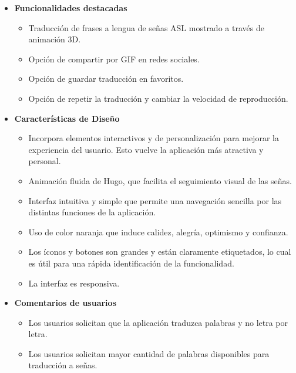     
\begin{itemize}
    \item \textbf{Funcionalidades destacadas}
    \begin{itemize}
        \item Traducción de frases a lengua de señas ASL mostrado a través de animación 3D.
        \item Opción de compartir por GIF en redes sociales.
        \item Opción de guardar traducción en favoritos.
        \item Opción de repetir la traducción y cambiar la velocidad de reproducción.
    \end{itemize}
    
    \item \textbf{Características de Diseño}
    \begin{itemize}
        \item Incorpora elementos interactivos y de personalización para mejorar la experiencia del usuario. Esto vuelve la aplicación más atractiva y personal.
        \item Animación fluida de Hugo, que facilita el seguimiento visual de las señas.
        \item Interfaz intuitiva y simple que permite una navegación sencilla por las distintas funciones de la aplicación.
        \item Uso de color naranja que induce calidez, alegría, optimismo y confianza.
        \item Los íconos y botones son grandes y están claramente etiquetados, lo cual es útil para una rápida identificación de la funcionalidad.
        \item La interfaz es responsiva.
    \end{itemize}

    \item \textbf{Comentarios de usuarios}
    \begin{itemize}
        \item Los usuarios solicitan que la aplicación traduzca palabras y no letra por letra.
        \item Los usuarios solicitan mayor cantidad de palabras disponibles para traducción a señas.
    \end{itemize}
\end{itemize}


